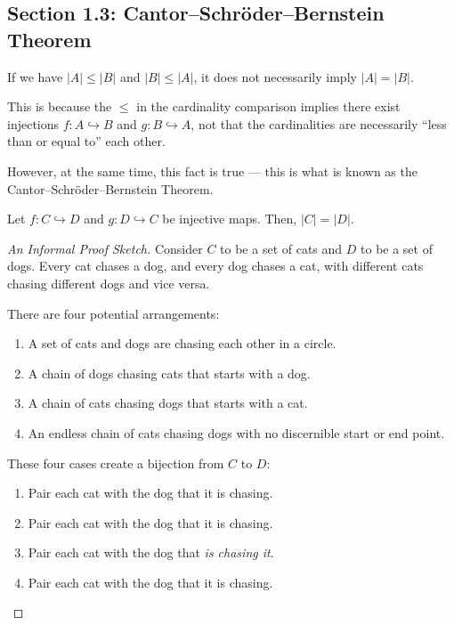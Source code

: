 \documentclass[10pt]{mypackage}
\begin{document}
\subsection{Section 1.3: Cantor--Schröder--Bernstein Theorem}%
\begin{example}
  If we have $|A| \leq |B|$ and $|B| \leq |A|$, it does not necessarily imply $|A| = |B|$.\newline

  This is because the $\leq$ in the cardinality comparison implies there exist injections $f: A\hookrightarrow B$ and $g: B\hookrightarrow A$, not that the cardinalities are necessarily ``less than or equal to'' each other.\newline

  However, at the same time, this fact is true --- this is what is known as the Cantor--Schröder--Bernstein Theorem.
\end{example}
\begin{theorem}
  Let $f: C\hookrightarrow D$ and $g: D\hookrightarrow C$ be injective maps. Then, $|C| = |D|$.
\end{theorem}
\begin{proof}[An Informal Proof Sketch]
  Consider $C$ to be a set of cats and $D$ to be a set of dogs. Every cat chases a dog, and every dog chases a cat, with different cats chasing different dogs and vice versa.\newline

  There are four potential arrangements:
  \begin{enumerate}[(1)]
    \item A set of cats and dogs are chasing each other in a circle.
    \item A chain of dogs chasing cats that starts with a dog.
    \item A chain of cats chasing dogs that starts with a cat.
    \item An endless chain of cats chasing dogs with no discernible start or end point.
  \end{enumerate}
  These four cases create a bijection from $C$ to $D$:
  \begin{enumerate}[(1)]
    \item Pair each cat with the dog that it is chasing.
    \item Pair each cat with the dog that it is chasing.
    \item Pair each cat with the dog that \textit{is chasing it}.
    \item Pair each cat with the dog that it is chasing.
  \end{enumerate}
\end{proof}
\end{document}
